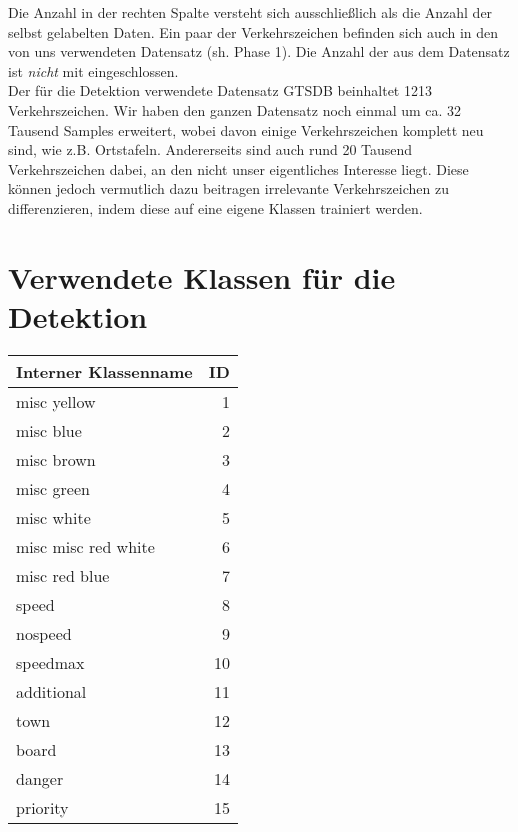 \begin{appendix}
Die Anzahl in der rechten Spalte versteht sich ausschließlich als die Anzahl der selbst gelabelten Daten. Ein paar der Verkehrszeichen befinden sich auch in den von uns verwendeten Datensatz (sh. Phase 1). Die Anzahl der  aus dem Datensatz ist \textit{nicht} mit eingeschlossen.\\

Der für die Detektion verwendete Datensatz GTSDB beinhaltet 1213 Verkehrszeichen. Wir haben den ganzen Datensatz noch einmal um ca. 32 Tausend Samples erweitert, wobei davon einige Verkehrszeichen komplett neu sind, wie z.B. Ortstafeln. Andererseits sind auch rund 20 Tausend Verkehrszeichen dabei, an den nicht unser eigentliches Interesse liegt. Diese können jedoch vermutlich dazu beitragen irrelevante Verkehrszeichen zu differenzieren, indem diese auf eine eigene Klassen trainiert werden.
\newpage
\section{Verwendete Klassen für die Detektion}
\label{sec:klassen_detektion}
\begin{longtabu}{|l|r|}
\hline
Interner Klassenname & ID \\
\hline
misc yellow & 1\\
\hline
misc blue & 2\\
\hline
misc brown & 3\\
\hline
misc green & 4\\
\hline
misc white & 5\\
\hline
misc misc red white & 6\\
\hline
misc red blue& 7\\
\hline
speed& 8\\
\hline
nospeed& 9\\
\hline
speedmax& 10\\
\hline
additional& 11\\
\hline
town& 12\\
\hline
board& 13\\
\hline
danger& 14\\
\hline
priority& 15\\
\hline
\end{longtabu}
\pagebreak

\printnoidxglossary[type=\acronymtype,numberedsection=autolabel] 

\end{appendix}